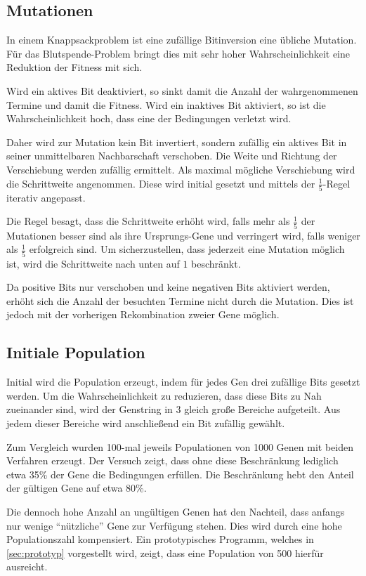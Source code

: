 \subsection{Mutationen}
In einem Knappsackproblem ist eine zufällige Bitinversion eine übliche Mutation.
Für das Blutspende-Problem bringt dies mit sehr hoher Wahrscheinlichkeit
eine Reduktion der Fitness mit sich.

Wird ein aktives Bit deaktiviert, so sinkt damit die Anzahl der wahrgenommenen Termine und damit die Fitness.
Wird ein inaktives Bit aktiviert, so ist die Wahrscheinlichkeit hoch, dass eine der Bedingungen verletzt wird.

Daher wird zur Mutation kein Bit invertiert, sondern zufällig ein aktives Bit in seiner unmittelbaren Nachbarschaft verschoben.
Die Weite und Richtung der Verschiebung werden zufällig ermittelt. Als maximal mögliche Verschiebung wird die Schrittweite angenommen.
Diese wird initial gesetzt und mittels der $\frac{1}{5}$-Regel iterativ angepasst.

Die Regel besagt, dass die Schrittweite erhöht wird, falls mehr als $\frac{1}{5}$ der Mutationen besser sind als ihre Ursprungs-Gene
und verringert wird, falls weniger als $\frac{1}{5}$ erfolgreich sind.
Um sicherzustellen, dass jederzeit eine Mutation möglich ist, wird die Schrittweite nach unten auf $1$ beschränkt.

Da positive Bits nur verschoben und keine negativen Bits aktiviert werden,
erhöht sich die Anzahl der besuchten Termine nicht durch die Mutation.
Dies ist jedoch mit der vorherigen Rekombination zweier Gene möglich.

\subsection{Initiale Population}
Initial wird die Population erzeugt,
indem für jedes Gen drei zufällige Bits gesetzt werden.
Um die Wahrscheinlichkeit zu reduzieren, dass diese Bits zu Nah zueinander sind,
wird der Genstring in 3 gleich große Bereiche aufgeteilt.
Aus jedem dieser Bereiche wird anschließend ein Bit zufällig gewählt.

Zum Vergleich wurden 100-mal jeweils Populationen von 1000 Genen mit beiden Verfahren erzeugt.
Der Versuch zeigt, dass ohne diese Beschränkung lediglich etwa 35\% der Gene die Bedingungen erfüllen.
Die Beschränkung hebt den Anteil der gültigen Gene auf etwa 80\%.

Die dennoch hohe Anzahl an ungültigen Genen hat den Nachteil,
dass anfangs nur wenige \enquote{nützliche} Gene zur Verfügung stehen.
Dies wird durch eine hohe Populationszahl kompensiert.
Ein prototypisches Programm, welches in \autoref{sec:prototyp} vorgestellt wird,
zeigt, dass eine Population von 500 hierfür ausreicht.

